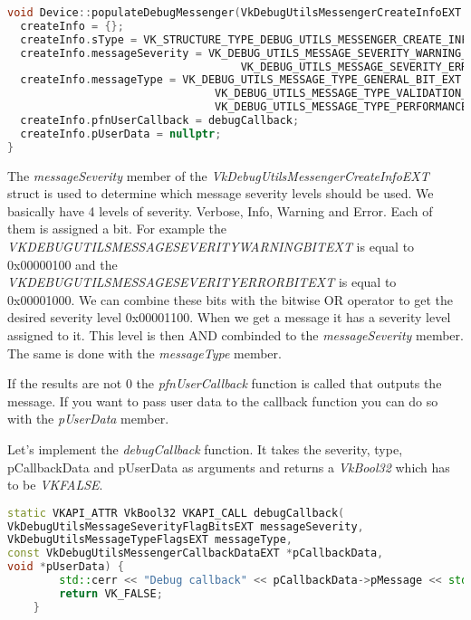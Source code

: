 \documentclass[12pt]{report} \usepackage{preamble}
\begin{document}
\begin{lstlisting}[language=C++]
void Device::populateDebugMessenger(VkDebugUtilsMessengerCreateInfoEXT &createInfo) {
  createInfo = {};
  createInfo.sType = VK_STRUCTURE_TYPE_DEBUG_UTILS_MESSENGER_CREATE_INFO_EXT;
  createInfo.messageSeverity = VK_DEBUG_UTILS_MESSAGE_SEVERITY_WARNING_BIT_EXT |
                                    VK_DEBUG_UTILS_MESSAGE_SEVERITY_ERROR_BIT_EXT;
  createInfo.messageType = VK_DEBUG_UTILS_MESSAGE_TYPE_GENERAL_BIT_EXT | 
                                VK_DEBUG_UTILS_MESSAGE_TYPE_VALIDATION_BIT_EXT |
                                VK_DEBUG_UTILS_MESSAGE_TYPE_PERFORMANCE_BIT_EXT;
  createInfo.pfnUserCallback = debugCallback;
  createInfo.pUserData = nullptr;
}
\end{lstlisting}

The \textit{messageSeverity} member of the \textit{VkDebugUtilsMessengerCreateInfoEXT} struct
is used to determine which message severity levels should be used. We basically have 4 levels of
severity. Verbose, Info, Warning and Error. Each of them is assigned a bit. For example the
\textit{VK\textunderscore DEBUG\textunderscore UTILS\textunderscore MESSAGE\textunderscore SEVERITY\textunderscore WARNING\textunderscore BIT\textunderscore EXT}
is equal to 0x00000100 and the \\
\textit{VK\textunderscore DEBUG\textunderscore UTILS\textunderscore MESSAGE\textunderscore SEVERITY\textunderscore ERROR\textunderscore BIT\textunderscore EXT}
is equal to 0x00001000. We can combine these bits with the bitwise OR operator to get the desired severity level
0x00001100. When we get a message it has a severity level assigned to it. This level is then AND combinded to the
\textit{messageSeverity} member. The same is done with the \textit{messageType} member.

If the results are not 0 the \textit{pfnUserCallback} function is called that
outputs the message.  If you want to pass user data to the callback function you can do so with the
\textit{pUserData} member.

Let's implement the \textit{debugCallback} function.
It takes the severity, type, pCallbackData and pUserData as arguments and returns a \textit{VkBool32}
which has to be \textit{VK\textunderscore FALSE}.

\begin{lstlisting}[language=C++]
static VKAPI_ATTR VkBool32 VKAPI_CALL debugCallback(
VkDebugUtilsMessageSeverityFlagBitsEXT messageSeverity,
VkDebugUtilsMessageTypeFlagsEXT messageType,
const VkDebugUtilsMessengerCallbackDataEXT *pCallbackData,
void *pUserData) {
		std::cerr << "Debug callback" << pCallbackData->pMessage << std::endl;
		return VK_FALSE;
	}
\end{lstlisting}
\end{document}
